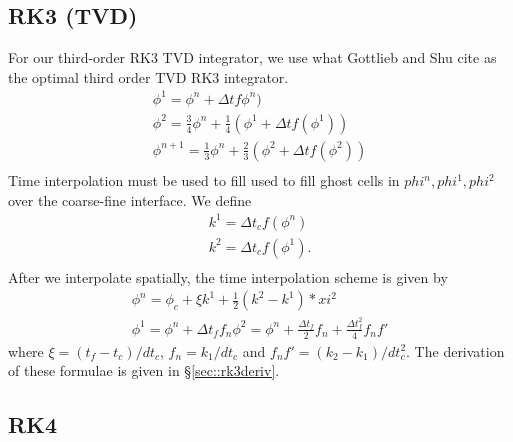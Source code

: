 \documentclass{article}
\newcommand{\dt}{{\Delta t}}
\begin{document}
\subsection{RK3 (TVD)}
\label{sec::rk3tvd}
For our third-order RK3 TVD  integrator, we  use what Gottlieb and Shu
\cite{gottlieb_shu} cite as the optimal third order TVD RK3
integrator.
$$
\begin{array}{l}
\phi^1 = \phi^n + \dt f\phi^n) \\
\phi^2    = \frac{3}{4} \phi^n +  \frac{1}{4}(\phi^1 + \dt f(\phi^1))\\
\phi^{n+1} = \frac{1}{3} \phi^n +  \frac{2}{3}(\phi^2 + \dt f(\phi^2))\\
\end{array}
$$
Time interpolation must be used to fill used to fill ghost cells in
$phi^n, phi^1, phi^2$ over the coarse-fine interface.  We define
$$
\begin{array}{l}
k^1 =  \dt_c f(\phi^n)\\
k^2 =  \dt_c f(\phi^1).\\
\end{array}
$$
After we interpolate spatially, the time interpolation scheme is given
by 
$$
\begin{array}{l}
\phi^n = \phi_c + \xi k^1 + \frac{1}{2}(k^2 - k^1)*xi^2 \\
\phi^1 = \phi^n + \dt_f f_n
\phi^2 = \phi^n + \frac{\dt_f}{2} f_n + \frac{\dt_f^2}{4}f_nf'
\end{array}
$$
where $\xi = (t_f- t_c)/dt_c$, $f_n = k_1/dt_c$ and $f_nf' =
(k_2-k_1)/dt_c^2$.  
The derivation of these formulae is given in \S \ref{sec::rk3deriv}.

\subsection{RK4}
\label{sec::rk4}
\end{document}
